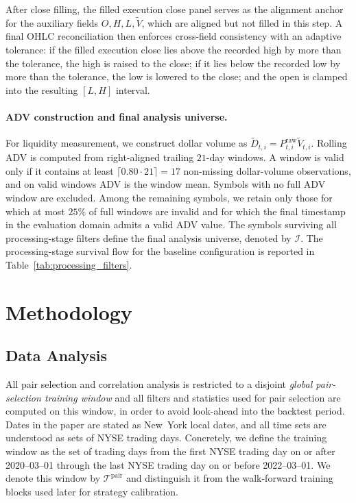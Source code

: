 \documentclass[11pt,a4paper]{article}
\begin{document}
After close filling, the filled execution close panel serves as the alignment
anchor for the auxiliary fields \(O,H,L,\widetilde V\), which are aligned but
not filled in this step. A final OHLC reconciliation then enforces cross-field
consistency with an adaptive tolerance: if the filled execution close lies
above the recorded high by more than the tolerance, the high is raised to the
close; if it lies below the recorded low by more than the tolerance, the low is
lowered to the close; and the open is clamped into the resulting \([L,H]\)
interval.

\paragraph{ADV construction and final analysis universe.}
For liquidity measurement, we construct dollar volume as
\(
\widetilde D_{t,i}=P^{\mathrm{raw}}_{t,i}\widetilde V_{t,i}.
\)
Rolling ADV is computed from right-aligned trailing \(21\)-day windows. A
window is valid only if it contains at least
\(
\lceil 0.80 \cdot 21 \rceil = 17
\)
non-missing dollar-volume observations, and on valid windows ADV is the window
mean. Symbols with no full ADV window are excluded. Among the remaining
symbols, we retain only those for which at most \(25\%\) of full windows are
invalid and for which the final timestamp in the evaluation domain admits a
valid ADV value. The symbols surviving all processing-stage filters define the
final analysis universe, denoted by \(\mathcal I\). The processing-stage
survival flow for the baseline configuration is reported in
Table~\ref{tab:processing_filters}.

\section{Methodology}

\subsection{Data Analysis}\label{sec:data_analysis}

All pair selection and correlation analysis is restricted to a disjoint
\emph{global pair-selection training window} and all filters and statistics used
for pair selection are computed on this window, in order to avoid look-ahead
into the backtest period. Dates in the paper are stated as New~York local dates,
and all time sets are understood as sets of NYSE trading days. Concretely, we
define the training window as the set of trading days from the first NYSE
trading day on or after 2020--03--01 through the last NYSE trading day on or
before 2022--03--01. We denote this window by
\(\mathcal{T}^{\mathrm{pair}}\) and distinguish it from the walk-forward
training blocks used later for strategy calibration.
\end{document}
